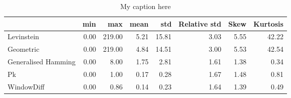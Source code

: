 \begin{table}[!ht]
\centering
\begin{tabular}{lrrrrrrr}
\toprule
{} &  min &    max &  mean &   std &  Relative std &  Skew &  Kurtosis \\
\midrule
Levinstein          & 0.00 & 219.00 &  5.21 & 15.81 &          3.03 &  5.55 &     42.22 \\
Geometric           & 0.00 & 219.00 &  4.84 & 14.51 &          3.00 &  5.53 &     42.54 \\
Generalised Hamming & 0.00 &   8.00 &  1.75 &  2.81 &          1.61 &  1.38 &      0.34 \\
Pk                  & 0.00 &   1.00 &  0.17 &  0.28 &          1.67 &  1.48 &      0.81 \\
WindowDiff          & 0.00 &   0.86 &  0.14 &  0.23 &          1.64 &  1.39 &      0.49 \\
\bottomrule
\end{tabular}
\caption{My caption here}
\label{tab:distance-descriptions}
\end{table}